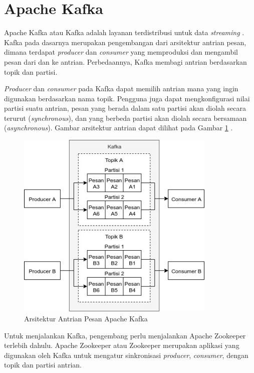 \section{Apache Kafka}
\par Apache Kafka atau Kafka adalah layanan terdistribusi untuk data \textit{streaming} \cite{kafka-online}. Kafka pada dasarnya merupakan pengembangan dari arsitektur antrian pesan, dimana terdapat \textit{producer} dan \textit{consumer} yang memproduksi dan mengambil pesan dari dan ke antrian. Perbedaannya, Kafka membagi antrian berdasarkan topik dan partisi.
\par \textit{Producer} dan \textit{consumer} pada Kafka dapat memilih antrian mana yang ingin digunakan berdasarkan nama topik. Pengguna juga dapat mengkonfigurasi nilai partisi suatu antrian, pesan yang berada dalam satu partisi akan diolah secara terurut (\textit{synchronous}), dan yang berbeda partisi akan diolah secara bersamaan (\textit{asynchronous}). Gambar arsitektur antrian dapat dilihat pada Gambar \ref{img:arsitektur-mq_kafka} \cite{kafka-online}.
\begin{figure}[H]
	\centering\includegraphics[width=0.85\textwidth]{bab2/img/arsitektur-mq_kafka.jpg}
	\caption{Arsitektur Antrian Pesan Apache Kafka}
	\label{img:arsitektur-mq_kafka}
\end{figure}
\par Untuk menjalankan Kafka, pengembang perlu menjalankan Apache Zookeeper terlebih dahulu. Apache Zookeeper atau Zookeeper merupakan aplikasi yang digunakan oleh Kafka untuk mengatur sinkronisasi \textit{producer}, \textit{consumer}, dengan topik dan partisi antrian.

